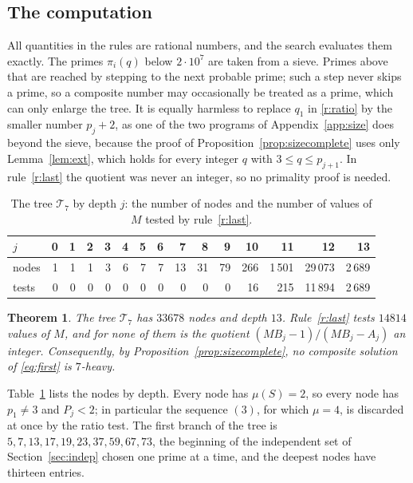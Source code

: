 \documentclass[11pt,reqno]{amsart}
\numberwithin{equation}{section}
\theoremstyle{plain}
\newtheorem{theorem}{Theorem}[section]
\theoremstyle{definition}
\theoremstyle{remark}
\begin{document}
\subsection{The computation}\label{sec:sizecomp}
All quantities in the rules are rational numbers, and the search
evaluates them exactly. The primes $\pi_i(q)$ below $2\cdot10^7$ are
taken from a sieve. Primes above that are reached by stepping to the
next probable prime; such a step never skips a prime, so a composite
number may occasionally be treated as a prime, which can only enlarge
the tree. It is equally harmless to replace $q_1$ in \ref{r:ratio} by
the smaller number $p_j+2$, as one of the two programs of
Appendix~\ref{app:size} does beyond the sieve, because the proof of
Proposition~\ref{prop:sizecomplete} uses only Lemma~\ref{lem:ext},
which holds for every integer $q$ with $3\le q\le p_{j+1}$. In
rule~\ref{r:last} the quotient was never an integer, so no primality
proof is needed.

\begin{table}[ht]
\centering
\caption{The tree $\mathcal T_7$ by depth $j$: the number of nodes and
the number of values of $M$ tested by rule~\ref{r:last}.}
\label{tab:heavy}
\smallskip
\small
\begin{tabular}{@{}l*{14}{r}@{}}
\toprule
$j$ & 0 & 1 & 2 & 3 & 4 & 5 & 6 & 7 & 8 & 9 & 10 & 11 & 12 & 13\\
\midrule
nodes & 1 & 1 & 1 & 3 & 6 & 7 & 7 & 13 & 31 & 79 & 266 & 1\,501 & 29\,073 & 2\,689\\
tests & 0 & 0 & 0 & 0 & 0 & 0 & 0 & 0 & 0 & 0 & 16 & 215 & 11\,894 & 2\,689\\
\bottomrule
\end{tabular}
\end{table}

\begin{theorem}\label{thm:sizesearch}
The tree $\mathcal T_7$ has $33678$ nodes and depth $13$.
Rule~\ref{r:last} tests $14814$ values of $M$, and for none of them is
the quotient $(MB_j-1)/(MB_j-A_j)$ an integer. Consequently, by
Proposition~\ref{prop:sizecomplete}, no composite solution of
\eqref{eq:first} is $7$-heavy.
\end{theorem}

Table~\ref{tab:heavy} lists the nodes by depth. Every node has
$\mu(S)=2$, so every node has $p_1\ne3$ and $P_j<2$; in particular
the sequence $(3)$, for which $\mu=4$, is discarded at once by the
ratio test. The first branch of the tree is
$5,7,13,17,19,23,37,59,67,73$, the beginning of the independent set
of Section~\ref{sec:indep} chosen one prime at a time, and the deepest
nodes have thirteen entries.
\end{document}
